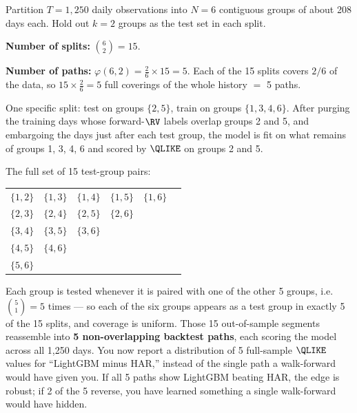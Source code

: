 \begin{workedexample}[CPCV with $N = 6$, $k = 2$]
Partition $T = 1{,}250$ daily observations into $N = 6$ contiguous groups of about 208 days each.
Hold out $k = 2$ groups as the test set in each split.

\textbf{Number of splits:} $\binom{6}{2} = 15$.

\textbf{Number of paths:} $\varphi(6,2) = \frac{2}{6} \times 15 = 5$.
Each of the 15 splits covers $2/6$ of the data, so $15 \times \frac{2}{6} = 5$ full coverings of the whole history $=$ 5 paths.

One specific split: test on groups $\{2,5\}$, train on groups $\{1,3,4,6\}$.
After purging the training days whose forward-$\RV$ labels overlap groups 2 and 5, and embargoing the days just after each test group, the model is fit on what remains of groups 1, 3, 4, 6 and scored by $\QLIKE$ on groups 2 and 5.

The full set of 15 test-group pairs:
\begin{center}
\begin{tabular}{cccccc}
\toprule
$\{1,2\}$ & $\{1,3\}$ & $\{1,4\}$ & $\{1,5\}$ & $\{1,6\}$ & \\
$\{2,3\}$ & $\{2,4\}$ & $\{2,5\}$ & $\{2,6\}$ & & \\
$\{3,4\}$ & $\{3,5\}$ & $\{3,6\}$ & & & \\
$\{4,5\}$ & $\{4,6\}$ & & & & \\
$\{5,6\}$ & & & & & \\
\bottomrule
\end{tabular}
\end{center}

Each group is tested whenever it is paired with one of the other 5 groups, i.e.\ $\binom{5}{1} = 5$ times --- so each of the six groups appears as a test group in exactly 5 of the 15 splits, and coverage is uniform.
Those 15 out-of-sample segments reassemble into \textbf{5 non-overlapping backtest paths}, each scoring the model across all 1,250 days.
You now report a distribution of 5 full-sample $\QLIKE$ values for ``LightGBM minus HAR,'' instead of the single path a walk-forward would have given you.
If all 5 paths show LightGBM beating HAR, the edge is robust; if 2 of the 5 reverse, you have learned something a single walk-forward would have hidden.
\end{workedexample}

